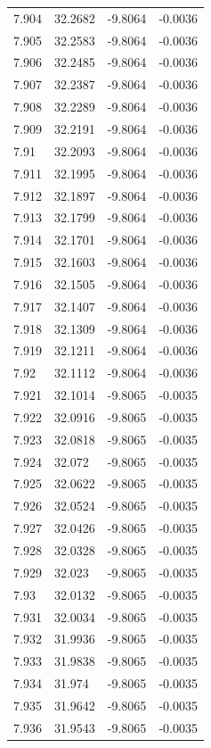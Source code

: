 \begin{tabular}{llll}
7.904 & 32.2682 & -9.8064 & -0.0036 \\
7.905 & 32.2583 & -9.8064 & -0.0036 \\
7.906 & 32.2485 & -9.8064 & -0.0036 \\
7.907 & 32.2387 & -9.8064 & -0.0036 \\
7.908 & 32.2289 & -9.8064 & -0.0036 \\
7.909 & 32.2191 & -9.8064 & -0.0036 \\
7.91 & 32.2093 & -9.8064 & -0.0036 \\
7.911 & 32.1995 & -9.8064 & -0.0036 \\
7.912 & 32.1897 & -9.8064 & -0.0036 \\
7.913 & 32.1799 & -9.8064 & -0.0036 \\
7.914 & 32.1701 & -9.8064 & -0.0036 \\
7.915 & 32.1603 & -9.8064 & -0.0036 \\
7.916 & 32.1505 & -9.8064 & -0.0036 \\
7.917 & 32.1407 & -9.8064 & -0.0036 \\
7.918 & 32.1309 & -9.8064 & -0.0036 \\
7.919 & 32.1211 & -9.8064 & -0.0036 \\
7.92 & 32.1112 & -9.8064 & -0.0036 \\
7.921 & 32.1014 & -9.8065 & -0.0035 \\
7.922 & 32.0916 & -9.8065 & -0.0035 \\
7.923 & 32.0818 & -9.8065 & -0.0035 \\
7.924 & 32.072 & -9.8065 & -0.0035 \\
7.925 & 32.0622 & -9.8065 & -0.0035 \\
7.926 & 32.0524 & -9.8065 & -0.0035 \\
7.927 & 32.0426 & -9.8065 & -0.0035 \\
7.928 & 32.0328 & -9.8065 & -0.0035 \\
7.929 & 32.023 & -9.8065 & -0.0035 \\
7.93 & 32.0132 & -9.8065 & -0.0035 \\
7.931 & 32.0034 & -9.8065 & -0.0035 \\
7.932 & 31.9936 & -9.8065 & -0.0035 \\
7.933 & 31.9838 & -9.8065 & -0.0035 \\
7.934 & 31.974 & -9.8065 & -0.0035 \\
7.935 & 31.9642 & -9.8065 & -0.0035 \\
7.936 & 31.9543 & -9.8065 & -0.0035 \\

\end{tabular}
